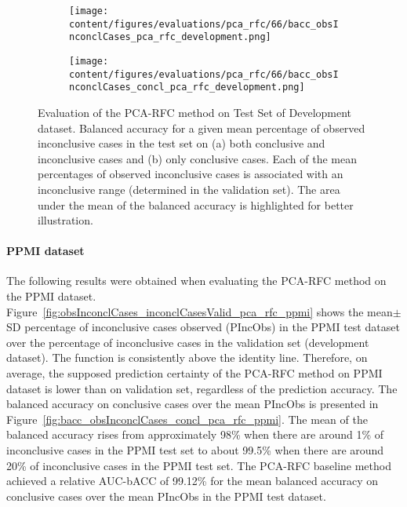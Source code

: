 \begin{figure}[ht]
  \begin{subfigure}{0.5\textwidth}
    \centering
    \texttt{[image: content/figures/evaluations/pca\_rfc/66/bacc\_obsInconclCases\_pca\_rfc\_development.png]}
    \subcaption{}
    \label{fig:bacc_obsInconclCases_pca_rfc_development}
  \end{subfigure}
  \hfill
  \begin{subfigure}{0.5\textwidth}
    \centering
    \texttt{[image: content/figures/evaluations/pca\_rfc/66/bacc\_obsInconclCases\_concl\_pca\_rfc\_development.png]}
    \subcaption{}
    \label{fig:bacc_obsInconclCases_concl_pca_rfc_development}
  \end{subfigure}

  \caption{Evaluation of the PCA-RFC method on Test Set of Development dataset.
  Balanced accuracy for a given mean percentage of observed inconclusive cases in the test set on 
  (a) both conclusive and inconclusive cases and (b) only conclusive cases. 
  Each of the mean percentages of observed inconclusive cases is associated with an inconclusive range (determined in the validation set). 
  The area under the mean of the balanced accuracy is highlighted for better illustration.}
  \label{fig:bacc_obsInconclCases_pca_rfc_development_full}
\end{figure}




\paragraph{PPMI dataset}

The following results were obtained when evaluating the PCA-RFC method on the PPMI dataset.
Figure~\ref{fig:obsInconclCases_inconclCasesValid_pca_rfc_ppmi} shows the
mean$\pm$SD percentage of inconclusive cases observed (PIncObs) in the PPMI test dataset 
over the percentage of inconclusive cases in the validation set (development dataset).
The function is consistently above the identity line.
Therefore, on average, the supposed prediction certainty of the PCA-RFC method on PPMI dataset is lower than on validation set,
regardless of the prediction accuracy.
The balanced accuracy on conclusive cases over the mean PIncObs is presented 
in Figure~\ref{fig:bacc_obsInconclCases_concl_pca_rfc_ppmi}.
The mean of the balanced accuracy rises from approximately 98\% 
when there are around 1\% of inconclusive cases in the PPMI test set to about 99.5\% 
when there are around 20\% of inconclusive cases in the PPMI test set.
The PCA-RFC baseline method achieved a relative AUC-bACC of 99.12\% for the mean balanced accuracy on conclusive cases 
over the mean PIncObs in the PPMI test dataset.

